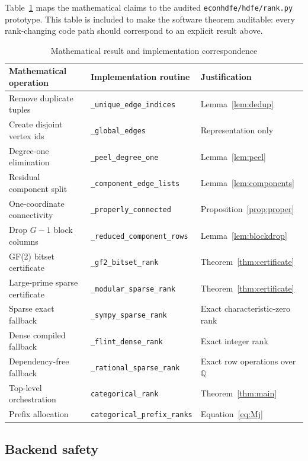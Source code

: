 \documentclass[11pt]{article}
\theoremstyle{definition}
\newcommand{\Q}{\mathbb{Q}}
\newcommand{\1}{\mathbf{1}}
\begin{document}
Table~\ref{tab:code} maps the mathematical claims to the audited \texttt{econhdfe/hdfe/rank.py} prototype. This table is included to make the software theorem auditable: every rank-changing code path should correspond to an explicit result above.

\begin{table}[htbp]
\centering
\caption{Mathematical result and implementation correspondence}
\label{tab:code}
\begin{tabular}{p{}p{}p{}}
\toprule
Mathematical operation & Implementation routine & Justification \\
\midrule
Remove duplicate tuples & \texttt{\_unique\_edge\_indices} & Lemma~\ref{lem:dedup} \\
Create disjoint vertex ids & \texttt{\_global\_edges} & Representation only \\
Degree-one elimination & \texttt{\_peel\_degree\_one} & Lemma~\ref{lem:peel} \\
Residual component split & \texttt{\_component\_edge\_lists} & Lemma~\ref{lem:components} \\
One-coordinate connectivity & \texttt{\_properly\_connected} & Proposition~\ref{prop:proper} \\
Drop $G-1$ block columns & \texttt{\_reduced\_component\_rows} & Lemma~\ref{lem:blockdrop} \\
GF(2) bitset certificate & \texttt{\_gf2\_bitset\_rank} & Theorem~\ref{thm:certificate} \\
Large-prime sparse certificate & \texttt{\_modular\_sparse\_rank} & Theorem~\ref{thm:certificate} \\
Sparse exact fallback & \texttt{\_sympy\_sparse\_rank} & Exact characteristic-zero rank \\
Dense compiled fallback & \texttt{\_flint\_dense\_rank} & Exact integer rank \\
Dependency-free fallback & \texttt{\_rational\_sparse\_rank} & Exact row operations over $\Q$ \\
Top-level orchestration & \texttt{categorical\_rank} & Theorem~\ref{thm:main} \\
Prefix allocation & \texttt{categorical\_prefix\_ranks} & Equation~\eqref{eq:Mj} \\
\bottomrule
\end{tabular}
\end{table}

\subsection{Backend safety}
\end{document}
